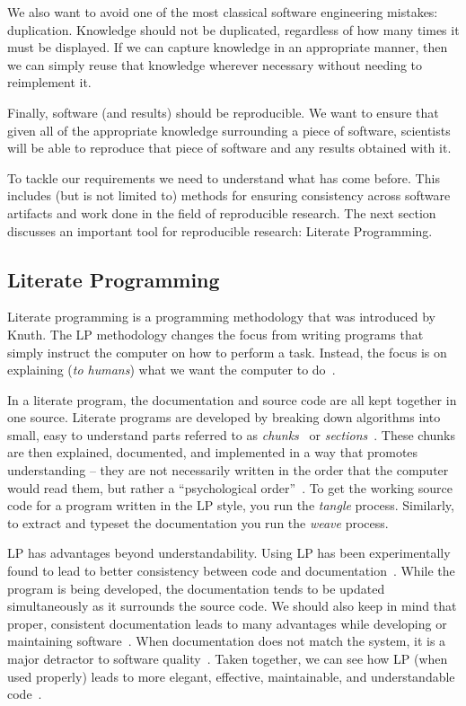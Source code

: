 \documentclass[preprint, 10pt]{sigplanconf}
\begin{document}
We also want to avoid one of the most classical software engineering mistakes:
duplication. Knowledge should not be duplicated, regardless of how many times it
must be displayed. If we can capture knowledge in an appropriate manner, then we
can simply reuse that knowledge wherever necessary without needing to
reimplement it.

Finally, software (and results) should be reproducible. We want to ensure that
given all of the appropriate knowledge surrounding a piece of software,
scientists will be able to reproduce that piece of software and any results
obtained with it.

To tackle our requirements we need to understand what has come before.  This
includes (but is not limited to) methods for ensuring consistency across
software artifacts and work done in the field of reproducible research.  The
next section discusses an important tool for reproducible research: Literate
Programming.

\subsection{Literate Programming}
\label{subsec:lp}

Literate programming is a programming methodology that was introduced by Knuth.
The LP methodology changes the focus from writing programs that simply instruct
the computer on how to perform a task. Instead, the focus is on explaining
(\emph{to humans}) what we want the computer to do~\cite{Knuth1984}.

In a literate program, the documentation and source code are all kept together in
one source. Literate programs are developed by breaking down algorithms into
small, easy to understand parts referred to as
\emph{chunks}~\cite{JohnsonAndJohnson1997} or \emph{sections}~\cite{Knuth1984}.
These chunks are then explained, documented, and implemented in a way that
promotes understanding -- they are not necessarily written in the order that the
computer would read them, but rather a ``psychological
order''~\cite{PieterseKourieAndBoake2004}. To get the working source code for a
program written in the LP style, you run the \emph{tangle} process. Similarly,
to extract and typeset the documentation you run the \emph{weave} process.

LP has advantages beyond understandability. Using LP has been experimentally
found to lead to better consistency between code and
documentation~\cite{ShumAndCook1993}. While the program is being developed, the
documentation tends to be updated simultaneously as it surrounds the source
code. We should also keep in mind that proper, consistent documentation leads to
many advantages while developing or maintaining software~\cite{Hyman1990,
Kotula2000}. When documentation does not match the system, it is a major
detractor to software quality~\cite{Kotula2000, Thimbleby1986}. Taken together,
we can see how LP (when used properly) leads to more elegant, effective,
maintainable, and understandable code~\cite{PieterseKourieAndBoake2004}.
\end{document}
